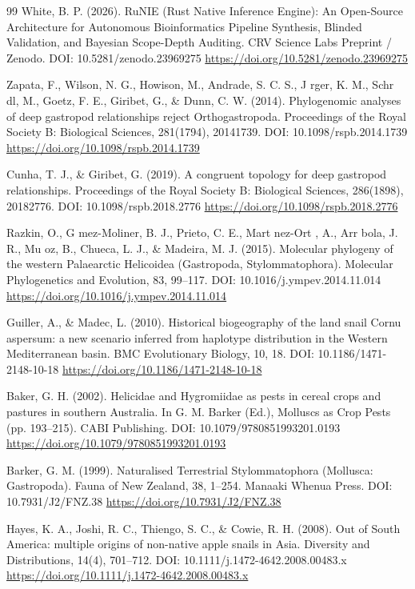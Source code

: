 \documentclass[10pt,letterpaper]{article}
\begin{document}
\begin{thebibliography}{99}
 White, B. P. (2026). RuNIE (Rust Native Inference Engine): An Open-Source Architecture for Autonomous Bioinformatics Pipeline Synthesis, Blinded Validation, and Bayesian Scope-Depth Auditing. CRV Science Labs Preprint / Zenodo. DOI: 10.5281/zenodo.23969275 \url{https://doi.org/10.5281/zenodo.23969275}

 Zapata, F., Wilson, N. G., Howison, M., Andrade, S. C. S., J rger, K. M., Schr dl, M., Goetz, F. E., Giribet, G., \& Dunn, C. W. (2014). Phylogenomic analyses of deep gastropod relationships reject Orthogastropoda. Proceedings of the Royal Society B: Biological Sciences, 281(1794), 20141739. DOI: 10.1098/rspb.2014.1739 \url{https://doi.org/10.1098/rspb.2014.1739}

 Cunha, T. J., \& Giribet, G. (2019). A congruent topology for deep gastropod relationships. Proceedings of the Royal Society B: Biological Sciences, 286(1898), 20182776. DOI: 10.1098/rspb.2018.2776 \url{https://doi.org/10.1098/rspb.2018.2776}

 Razkin, O., G mez-Moliner, B. J., Prieto, C. E., Mart nez-Ort , A., Arr bola, J. R., Mu oz, B., Chueca, L. J., \& Madeira, M. J. (2015). Molecular phylogeny of the western Palaearctic Helicoidea (Gastropoda, Stylommatophora). Molecular Phylogenetics and Evolution, 83, 99--117. DOI: 10.1016/j.ympev.2014.11.014 \url{https://doi.org/10.1016/j.ympev.2014.11.014}

 Guiller, A., \& Madec, L. (2010). Historical biogeography of the land snail Cornu aspersum: a new scenario inferred from haplotype distribution in the Western Mediterranean basin. BMC Evolutionary Biology, 10, 18. DOI: 10.1186/1471-2148-10-18 \url{https://doi.org/10.1186/1471-2148-10-18}

 Baker, G. H. (2002). Helicidae and Hygromiidae as pests in cereal crops and pastures in southern Australia. In G. M. Barker (Ed.), Molluscs as Crop Pests (pp. 193--215). CABI Publishing. DOI: 10.1079/9780851993201.0193 \url{https://doi.org/10.1079/9780851993201.0193}

 Barker, G. M. (1999). Naturalised Terrestrial Stylommatophora (Mollusca: Gastropoda). Fauna of New Zealand, 38, 1--254. Manaaki Whenua Press. DOI: 10.7931/J2/FNZ.38 \url{https://doi.org/10.7931/J2/FNZ.38}

 Hayes, K. A., Joshi, R. C., Thiengo, S. C., \& Cowie, R. H. (2008). Out of South America: multiple origins of non-native apple snails in Asia. Diversity and Distributions, 14(4), 701--712. DOI: 10.1111/j.1472-4642.2008.00483.x \url{https://doi.org/10.1111/j.1472-4642.2008.00483.x}


\end{thebibliography}
\end{document}
